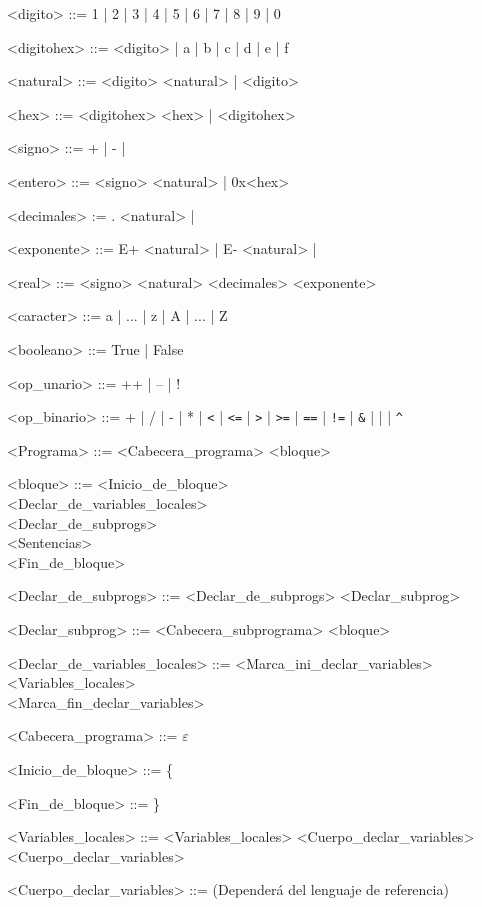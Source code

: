 \documentclass{scrartcl}
\begin{document}
\setlength{\grammarparsep}{4pt plus 1pt minus 1pt}
\begin{grammar}

<digito> ::= 1 | 2 | 3 | 4 | 5 | 6 | 7 | 8 | 9 | 0

<digitohex> ::= <digito> | a | b | c | d | e | f

<natural> ::= <digito> <natural> | <digito>

<hex> ::= <digitohex> <hex> | <digitohex>

<signo> ::= + | - |

<entero> ::= <signo> <natural> | 0x<hex>

<decimales> := . <natural> |

<exponente> ::= E+ <natural> | E- <natural> |

<real> ::= <signo> <natural> <decimales> <exponente>

<caracter> ::= a | ... | z | A | ... | Z

<booleano> ::= True | False

<op_unario> ::= ++ | -- | !

<op_binario> ::= + | / | - | * | \verb|<| | \verb|<=| | \verb|>| | \verb|>=| | \verb|==| | \verb|!=| | \verb|&| | \verb||| | \verb|^|

<Programa> ::= <Cabecera_programa> <bloque>

<bloque> ::= <Inicio_de_bloque> \\
 <Declar_de_variables_locales> \\
 <Declar_de_subprogs> \\
 <Sentencias> \\
 <Fin_de_bloque>

<Declar_de_subprogs> ::= <Declar_de_subprogs> <Declar_subprog>

<Declar_subprog> ::= <Cabecera_subprograma> <bloque>

<Declar_de_variables_locales> ::= <Marca_ini_declar_variables> \\
<Variables_locales> \\
<Marca_fin_declar_variables>

<Cabecera_programa> ::= $\varepsilon$

<Inicio_de_bloque> ::= \{

<Fin_de_bloque> ::= \}

<Variables_locales> ::= <Variables_locales> <Cuerpo_declar_variables>
\alt <Cuerpo_declar_variables>

<Cuerpo_declar_variables> ::= (Dependerá del lenguaje de referencia)


\end{grammar}
\end{document}
